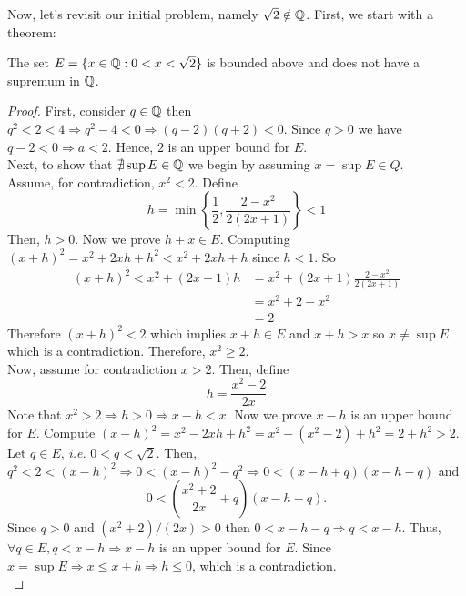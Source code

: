 Now, let's revisit our initial problem, namely $\sqrt{2} \notin \mathbb{Q}$. First, we start with a theorem:

\begin{theorem}
    The set $E = \{ x \in \mathbb{Q}: 0 < x < \sqrt{2}\}$ is bounded above and does not have a supremum in $\mathbb{Q}$.
\end{theorem}

\begin{proof}
    First, consider $q \in \mathbb{Q}$ then $q^2 <  2 < 4 \Rightarrow q^2 - 4 < 0 \Rightarrow (q-2)(q+2) < 0$. Since $q > 0$ we have $q - 2 < 0 \Rightarrow a <  2$. Hence, $2$ is an upper bound for $E$.\\
    Next, to show that $\nexists \sup E \in \mathbb{Q}$ we begin by assuming $x = \sup E \in Q$. \\
    Assume, for contradiction, $x^2 < 2$. Define
    \begin{equation*}
        h = \min \left\{ 
            \frac{1}{2}, \frac{2 - x^2}{2(2x+1)}
        \right\} < 1
    \end{equation*}
    Then, $h > 0$. Now we prove $h + x \in E$. Computing $(x+h)^2 = x^2 +2xh + h^2 < x^2 + 2xh + h$ since $h < 1$. So
    \begin{equation*}
        \begin{split}
            (x+ h)^2 < x^2 + (2x + 1)h &= x^2 + (2x+1)\frac{2-x^2}{2(2x+1)} \\
            &= x^2 + 2 - x^2 \\
            &= 2
        \end{split}
    \end{equation*}
    Therefore $(x+h)^2 < 2$ which implies $x + h \in E$ and $x + h > x$ so $x \neq \sup E$ which is a contradiction. Therefore, $x^2 \geq 2$. \\
    Now, assume for contradiction $x > 2$. Then, define
    \begin{equation*}
        h = \frac{x^2 - 2}{2x}
    \end{equation*}
    Note that $x^2 > 2 \Rightarrow h > 0 \Rightarrow x - h < x$. Now we prove $x-h$ is an upper bound for $E$. Compute $(x-h)^2 = x^2 -2xh + h^2 = x^2 - (x^2 - 2) + h^2 = 2 + h^2 > 2$. Let $q \in E$, \emph{i.e.} $0 < q < \sqrt{2}$. Then, $q^2 < 2 < (x - h)^2 \Rightarrow 0 <  (x - h)^2 - q^2 \Rightarrow 0 < (x-h+q)(x-h-q)$ and
    \begin{equation*}
        0 < \left(
            \frac{x^2+2}{2x} + q
        \right)(x-h-q).
    \end{equation*}
    Since $q > 0$ and $(x^2+2)/(2x) > 0$ then $0 < x-h-q \Rightarrow q < x-h$. Thus, $\forall q \in E, q < x - h \Rightarrow x-h$ is an upper bound for $E$. Since $x = \sup E \Rightarrow x \leq x + h \Rightarrow h \leq 0$, which is a contradiction. \\

\end{proof}
